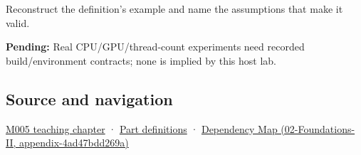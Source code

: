 Reconstruct the definition's example and name the assumptions that make it valid.

\textbf{Pending:} Real CPU/GPU/thread-count experiments need recorded build/environment contracts; none is implied by this host lab.

\subsection{Source and navigation}\label{appendix-5f1a2c3f97ff-source-and-navigation}

\hyperref[01-foundations-i-ch001-when-arithmetic-meets-uncertainty]{M005 teaching chapter} · \hyperref[appendix-fd090d982a15-m005---parts-77-88]{Part definitions} · \href{../02-Foundations-II/main.pdf\#nameddest=appendix-4ad47bdd269a}{Dependency Map (02-Foundations-II, appendix-4ad47bdd269a)}
